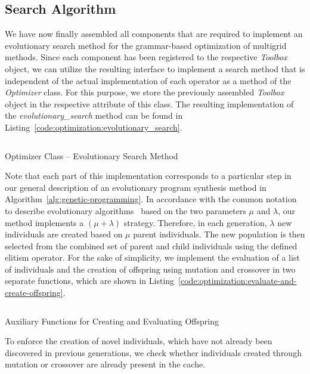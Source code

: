 \subsection{Search Algorithm}
\label{sec:evostencils-part1:search-algorithm}
We have now finally assembled all components that are required to implement an evolutionary search method for the grammar-based optimization of multigrid methods.
Since each component has been registered to the respective \emph{Toolbox} object, we can utilize the resulting interface to implement a search method that is independent of the actual implementation of each operator as a method of the \emph{Optimizer} class. 
For this purpose, we store the previously assembled \emph{Toolbox} object in the respective attribute of this class.
The resulting implementation of the \emph{evolutionary\_search} method can be found in Listing~\ref{code:optimization:evolutionary_search}. 
\begin{listing}
	\inputminted[linenos]{python}{evostencils/optimization/evolutionary_search.py}
	\caption{Optimizer Class -- Evolutionary Search Method}
	\label{code:optimization:evolutionary_search}
\end{listing}
Note that each part of this implementation corresponds to a particular step in our general description of an evolutionary program synthesis method in Algorithm~\ref{alg:genetic-programming}.
In accordance with the common notation to describe evolutionary algorithms~\cite{back1997handbook} based on the two parameters $\mu$ and $\lambda$, our method implements a $\left(\mu + \lambda \right)$ strategy.
Therefore, in each generation, $\lambda$ new individuals are created based on $\mu$ parent individuals.
The new population is then selected from the combined set of parent and child individuals using the defined elitism operator.
For the sake of simplicity, we implement the evaluation of a list of individuals and the creation of offspring using mutation and crossover in two separate functions, which are shown in Listing~\ref{code:optimization:evaluate-and-create-offspring}.
\begin{listing}
	\inputminted{python}{evostencils/optimization/evolutionary_search_helper.py}
	\caption{Auxiliary Functions for Creating and Evaluating Offspring}
	\label{code:optimization:evaluate-and-create-offspring}
\end{listing}
To enforce the creation of novel individuals, which have not already been discovered in previous generations, we check whether individuals created through mutation or crossover are already present in the cache.
